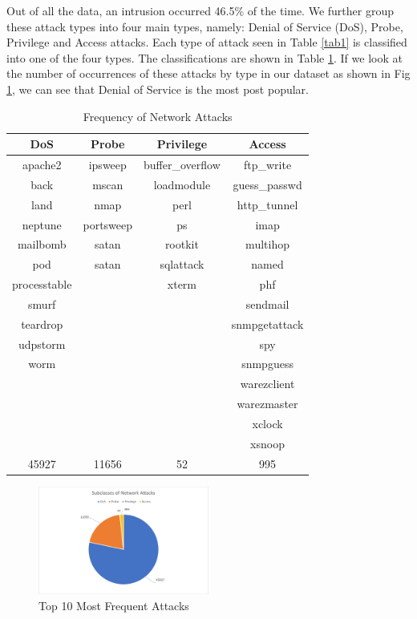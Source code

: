\documentclass[conference]{IEEEtran}
\begin{document}
Out of all the data, an intrusion occurred 46.5\% of the time. We further group these attack types into four main types, namely: Denial of Service (DoS), Probe, Privilege and Access attacks. Each type of attack seen in Table \ref{tab1} is classified into one of the four types. The classifications are shown in Table \ref{tab2}. If we look at the number of occurrences of these attacks by type in our dataset as shown in Fig \ref{fig2}, we can see that Denial of Service is the most post popular.

\begin{table}[htbp]
\caption{Frequency of Network Attacks}
\begin{center}
\begin{tabular}{|c|c|c|c|}
\hline
DoS	&	Probe	&	Privilege	&	Access	\\
\hline
apache2	&	ipsweep	&	buffer\_overflow	&	ftp\_write	\\
back	&	mscan	&	loadmodule	&	guess\_passwd	\\
land	&	nmap	&	perl	&	http\_tunnel	\\
neptune	&	portsweep	&	ps	&	imap	\\
mailbomb	&	satan	&	rootkit	&	multihop	\\
pod	&	satan	&	sqlattack	&	named	\\
processtable	&		&	xterm	&	phf	\\
smurf	&		&		&	sendmail	\\
teardrop	&		&		&	snmpgetattack	\\
udpstorm	&		&		&	spy	\\
worm	&		&		&	snmpguess	\\
	&		&		&	warezclient	\\
	&		&		&	warezmaster	\\
	&		&		&	xclock	\\
	&		&		&	xsnoop	\\
\hline
45927 &	 11656  &	 52  &	995
	\\
\hline
\end{tabular}
\label{tab2}
\end{center}
\end{table}

\begin{figure}[htbp]
\centerline{\includegraphics[height= 170 pt, width=0.50\textwidth]{External/Fig-Subclasses-of-Attacks.PNG}}
\caption{Top 10 Most Frequent Attacks}
\label{fig2}
\end{figure}
\end{document}
